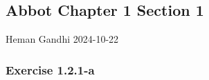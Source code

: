 \documentclass{article}
\begin{document}
\begin{center}
\subsection*{Abbot Chapter 1 Section 1}
\end{center}

Heman Gandhi
\hfill
2024-10-22\\


\subsubsection*{Exercise 1.2.1-a}
\end{document}
